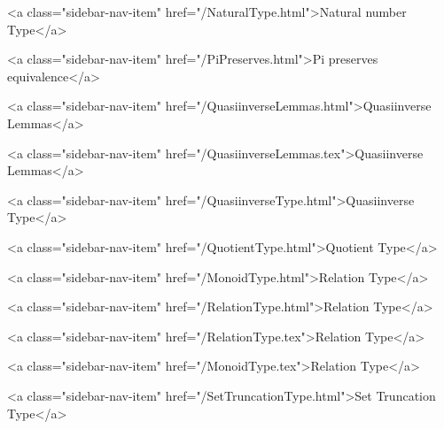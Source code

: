       
    
      
        
          <a class="sidebar-nav-item" href="/NaturalType.html">Natural number Type</a>
        
      
    
      
        
          <a class="sidebar-nav-item" href="/PiPreserves.html">Pi preserves equivalence</a>
        
      
    
      
        
          <a class="sidebar-nav-item" href="/QuasiinverseLemmas.html">Quasiinverse Lemmas</a>
        
      
    
      
        
          <a class="sidebar-nav-item" href="/QuasiinverseLemmas.tex">Quasiinverse Lemmas</a>
        
      
    
      
        
          <a class="sidebar-nav-item" href="/QuasiinverseType.html">Quasiinverse Type</a>
        
      
    
      
        
          <a class="sidebar-nav-item" href="/QuotientType.html">Quotient Type</a>
        
      
    
      
        
          <a class="sidebar-nav-item" href="/MonoidType.html">Relation Type</a>
        
      
    
      
        
          <a class="sidebar-nav-item" href="/RelationType.html">Relation Type</a>
        
      
    
      
        
          <a class="sidebar-nav-item" href="/RelationType.tex">Relation Type</a>
        
      
    
      
        
          <a class="sidebar-nav-item" href="/MonoidType.tex">Relation Type</a>
        
      
    
      
        
          <a class="sidebar-nav-item" href="/SetTruncationType.html">Set Truncation Type</a>
        
